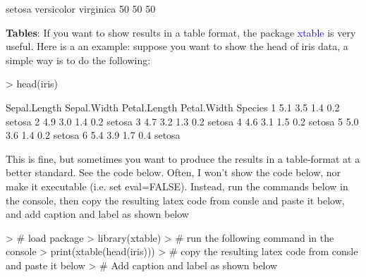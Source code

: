 \documentclass[10pt]{article}
\begin{document}
\begin{Schunk}
\begin{Soutput}
    setosa versicolor  virginica 
        50         50         50 
\end{Soutput}
\end{Schunk}

\textbf{Tables}: If you want to show results in a table format, the package \textcolor{blue}{xtable} is very useful. Here is a an example: suppose you want to show the head of iris data, a simple way is to do the following: 

\begin{Schunk}
\begin{Sinput}
> head(iris)
\end{Sinput}
\end{Schunk}

\begin{Schunk}
\begin{Soutput}
  Sepal.Length Sepal.Width Petal.Length Petal.Width Species
1          5.1         3.5          1.4         0.2  setosa
2          4.9         3.0          1.4         0.2  setosa
3          4.7         3.2          1.3         0.2  setosa
4          4.6         3.1          1.5         0.2  setosa
5          5.0         3.6          1.4         0.2  setosa
6          5.4         3.9          1.7         0.4  setosa
\end{Soutput}
\end{Schunk}

This is fine, but sometimes you want to produce  the results in a table-format at a better standard. See the code below. Often, I won't show the code below, nor make it executable (i.e. set eval=FALSE). Instead, run the commands below in the console, then copy the resulting latex code from consle and paste it below, and add caption and label as shown below

\begin{Schunk}
\begin{Sinput}
> # load package 
> library(xtable)
> # run the following command in the console
> print(xtable(head(iris)))
> # copy the resulting latex code from consle and paste it below
> # Add caption and label as shown below
\end{Sinput}
\end{Schunk}
\end{document}
